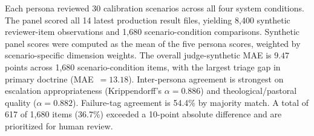 \documentclass[11pt]{article}
\begin{document}
Each persona reviewed 30 calibration scenarios across all four system conditions.
The panel scored all 14 latest production result files, yielding 8,400 synthetic
reviewer-item observations and 1,680 scenario-condition comparisons. Synthetic panel
scores were computed as the mean of the five persona scores, weighted by
scenario-specific dimension weights. The overall judge-synthetic MAE is $9.47$ points
across 1,680 scenario-condition items, with the largest triage gap in primary doctrine
(MAE~$= 13.18$). Inter-persona agreement is strongest on escalation appropriateness
(Krippendorff's $\alpha = 0.886$) and theological/pastoral quality
($\alpha = 0.882$). Failure-tag agreement is 54.4\% by majority match. A total of
617 of 1,680 items (36.7\%) exceeded a 10-point absolute difference and are prioritized for
human review.
\end{document}
